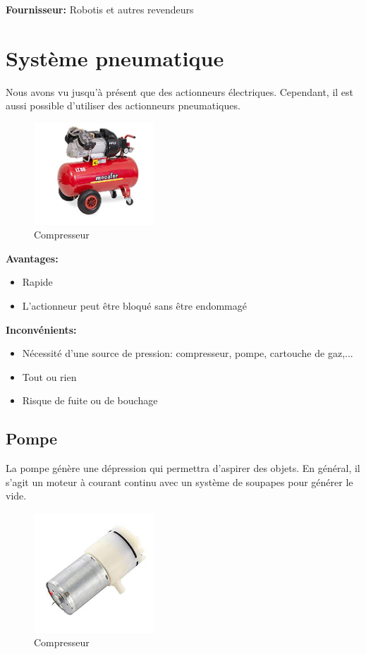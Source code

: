 \documentclass[a4paper, 11pt]{report}
\begin{document}
\textbf{Fournisseur:} Robotis et autres revendeurs

\chapter{Système pneumatique}
Nous avons vu jusqu'à présent que des actionneurs électriques. Cependant, il est aussi possible d'utiliser des actionneurs pneumatiques.

\begin{figure}
\begin{centering}
\includegraphics[width=0.4\textwidth]{images/compresseur.jpg}
\caption{Compresseur}
\par\end{centering}
\end{figure}

\textbf{Avantages:}
\begin{itemize}
\item Rapide
\item L'actionneur peut être bloqué sans être endommagé
\end{itemize}

\textbf{Inconvénients:}
\begin{itemize}
\item Nécessité d'une source de pression: compresseur, pompe, cartouche de gaz,...
\item Tout ou rien
\item Risque de fuite ou de bouchage
\end{itemize}

\section{Pompe}
La pompe génère une dépression qui permettra d'aspirer des objets. En général, il s'agit un moteur à courant continu avec un système de soupapes pour générer le vide.

\begin{figure}
\begin{centering}
\includegraphics[width=0.4\textwidth]{images/pompeAvide.jpeg}
\caption{Compresseur}
\par\end{centering}
\end{figure}
\end{document}
